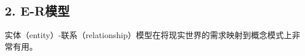 \documentclass[aspectratio=169, 14pt]{beamer}
\begin{document}
%
%
%
%
%
%
%
%
%


\begin{frame}
    \section{\textcolor{darkmidnightblue}{2. E-R模型}}
    实体（entity）-联系（relationship）模型在将现实世界的需求映射到概念模式上非常有用。
\end{frame}
\end{document}
